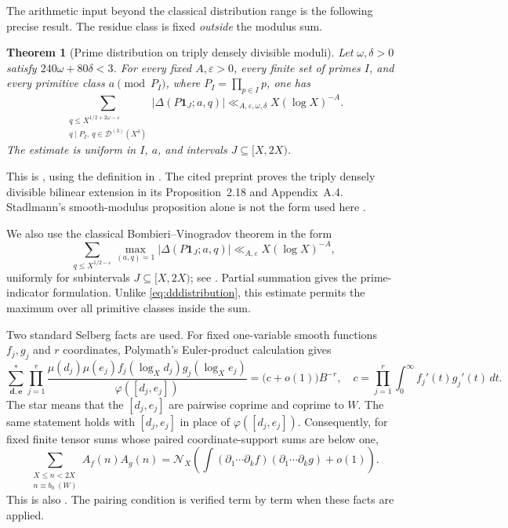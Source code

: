 \documentclass[11pt,a4paper]{article}
\newtheorem{theorem}{Theorem}[section]
\theoremstyle{definition}\newtheorem{definition}[theorem]{Definition}
\theoremstyle{remark}\newtheorem{remark}[theorem]{Remark}
\newcommand{\ind}{\mathbf 1}\newcommand{\dd}{\,d}
\numberwithin{equation}{section}
\begin{document}
The arithmetic input beyond the classical distribution range is the following precise result. The residue class is fixed \emph{outside} the modulus sum.
\begin{theorem}[Prime distribution on triply densely divisible moduli]\label{thm:distribution}
Let $\omega,\delta>0$ satisfy $240\omega+80\delta<3$. For every fixed $A,\varepsilon>0$, every finite set of primes $I$, and every primitive class $a\pmod {P_I}$, where $P_I=\prod_{p\in I}p$, one has
\begin{equation}\label{eq:dddistribution}
 \sum_{\substack{q\le X^{1/2+2\omega-\varepsilon}\\q\mid P_I,\ q\in\mathcal D^{(3)}(X^\delta)}}
 |\Delta(P\ind_J;a,q)|\ll_{A,\varepsilon,\omega,\delta}X(\log X)^{-A}.
\end{equation}
The estimate is uniform in $I$, $a$, and intervals $J\subseteq[X,2X)$.
\end{theorem}
This is \cite[Corollary~2.19, $r=3$, with (2.5)]{shortgaps}, using the definition in \cite[Definition~2.1]{shortgaps}. The cited preprint proves the triply densely divisible bilinear extension in its Proposition~2.18 and Appendix~A.4. Stadlmann's smooth-modulus proposition alone is not the form used here \cite[Proposition~1 and \S2.1.1]{stadlmann}.

We also use the classical Bombieri--Vinogradov theorem in the form
\begin{equation}\label{eq:bv}
 \sum_{q\le X^{1/2-\varepsilon}}\max_{(a,q)=1}
 |\Delta(P\ind_J;a,q)|\ll_{A,\varepsilon}X(\log X)^{-A},
\end{equation}
uniformly for subintervals $J\subseteq[X,2X)$; see \cite[Theorem~2.3]{polymath}. Partial summation gives the prime-indicator formulation. Unlike \eqref{eq:dddistribution}, this estimate permits the maximum over all primitive classes inside the sum.

Two standard Selberg facts are used. For fixed one-variable smooth functions $f_j,g_j$ and $r$ coordinates, Polymath's Euler-product calculation \cite[Lemma~4.1]{polymath} gives
\begin{equation}\label{eq:euler}
 \sum_{\boldsymbol d,\boldsymbol e}^{*}
 \prod_{j=1}^{r}
 \frac{\mu(d_j)\mu(e_j)f_j(\log_Xd_j)g_j(\log_Xe_j)}
 {\varphi([d_j,e_j])}
 =\bigl(c+o(1)\bigr)B^{-r},
 \quad c=\prod_{j=1}^{r}\int_0^\infty f_j'(t)g_j'(t)\dd t.
\end{equation}
The star means that the $[d_j,e_j]$ are pairwise coprime and coprime to $W$. The same statement holds with $[d_j,e_j]$ in place of $\varphi([d_j,e_j])$. Consequently, for fixed finite tensor sums whose paired coordinate-support sums are below one,
\begin{equation}\label{eq:unweighted}
 \sum_{\substack{X\le n<2X\\n\equiv b_0\ (W)}} A_f(n)A_g(n)
 =\mathcal N_X\left(\int (\partial_1\cdots\partial_k f)
 (\partial_1\cdots\partial_k g)+o(1)\right).
\end{equation}
This is also \cite[Theorem~3.6(i)]{polymath}. The pairing condition is verified term by term when these facts are applied.
\end{document}
